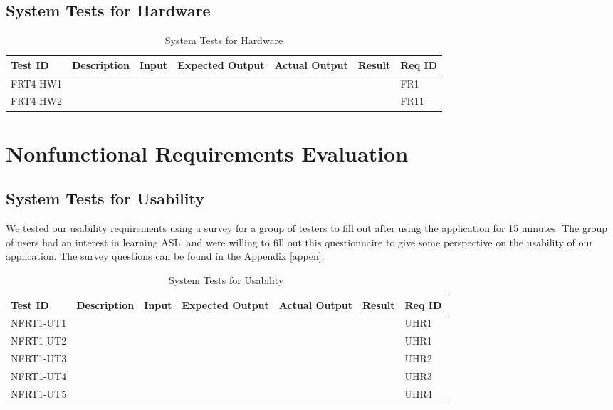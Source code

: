\documentclass[12pt, titlepage]{article}
\begin{document}
\subsection{System Tests for Hardware}
\begin{longtable}{|p{1cm}|p{3cm}|p{2cm}|p{2cm}|p{2cm}|p{2cm}|p{1cm}|}
\caption{System Tests for Hardware} \\
\hline
\textbf{Test ID} & \textbf{Description} & \textbf{Input} & \textbf{Expected Output} & \textbf{Actual Output} & \textbf{Result} & \textbf{Req ID}\\
\hline
FRT4-HW1 & & & & & & FR1 \\
\hline
FRT4-HW2 & & & & & & FR11 \\
\bottomrule
\end{longtable}

\section{Nonfunctional Requirements Evaluation}

\subsection{System Tests for Usability}

We tested our usability requirements using a survey for a group of testers to fill out after using the application for 15 minutes. The group of users had an interest in learning ASL, and were willing to fill out this questionnaire to give some perspective on the usability of our application. The survey questions can be found in the Appendix \ref{appen}.

\begin{longtable}{|p{2cm}|p{3cm}|p{2cm}|p{2cm}|p{2cm}|p{2cm}|p{1cm}|}
\caption{System Tests for Usability} \\
\hline
\textbf{Test ID} & \textbf{Description} & \textbf{Input} & \textbf{Expected Output} & \textbf{Actual Output} & \textbf{Result} & \textbf{Req ID}\\
\hline
NFRT1-UT1 & & & & & & UHR1 \\
\hline
NFRT1-UT2 & & & & & & UHR1 \\
\hline
NFRT1-UT3 & & & & & & UHR2 \\
\hline
NFRT1-UT4 & & & & & & UHR3 \\
\hline
NFRT1-UT5 & & & & & & UHR4 \\
\bottomrule
\end{longtable}
		
\end{document}
